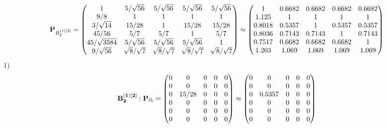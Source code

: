 \documentclass[10pt,a4paper]{article}
\begin{document}
	\[
		\bold{P}_{B_2^{(1)[2]}} = 
		\begin{pmatrix}
			{1}{} & {{5}} / {\sqrt{56}} & {{5}} / {\sqrt{56}} & {{5}} / {\sqrt{56}} & {{5}} / {\sqrt{56}} \\
			{{9}} / {{8}} & {1}{} & {1}{} & {1}{} & {1}{} \\
			{{3}} / {\sqrt{14}} & {{15}} / {{28}} & {1}{} & {{15}} / {{28}} & {{15}} / {{28}} \\
			{{45}} / {{56}} & {{5}} / {{7}} & {{5}} / {{7}} & {1}{} & {{5}} / {{7}} \\
			{{45}} / {\sqrt{3584}} & {{5}} / {\sqrt{56}} & {{5}} / {\sqrt{56}} & {{5}} / {\sqrt{56}} & {1}{} \\
			{{9}} / {\sqrt{56}} & {\sqrt{8}} / {\sqrt{7}} & {\sqrt{8}} / {\sqrt{7}} & {\sqrt{8}} / {\sqrt{7}} & {\sqrt{8}} / {\sqrt{7}} \\
		\end{pmatrix}
		\approx
		\begin{pmatrix}
			1        & 0.6682   & 0.6682   & 0.6682   & 0.6682   \\
			1.125    & 1        & 1        & 1        & 1        \\
			0.8018   & 0.5357   & 1        & 0.5357   & 0.5357   \\
			0.8036   & 0.7143   & 0.7143   & 1        & 0.7143   \\
			0.7517   & 0.6682   & 0.6682   & 0.6682   & 1        \\
			1.203    & 1.069    & 1.069    & 1.069    & 1.069    \\
		\end{pmatrix}
	\]
	1)
	\[
		\bold{B_2^{(1)[2]}}: \bold{P}_{lk} = 
		\begin{pmatrix}
			{{0}}{} & {{0}}{} & {{0}}{} & {{0}}{} & {{0}}{} \\
			{{0}}{} & {{0}}{} & {{0}}{} & {{0}}{} & {{0}}{} \\
			{{0}}{} & {{15}} / {{28}} & {{0}}{} & {{0}}{} & {{0}}{} \\
			{{0}}{} & {{0}}{} & {{0}}{} & {{0}}{} & {{0}}{} \\
			{{0}}{} & {{0}}{} & {{0}}{} & {{0}}{} & {{0}}{} \\
			{{0}}{} & {{0}}{} & {{0}}{} & {{0}}{} & {{0}}{} \\
		\end{pmatrix}
		\approx
		\begin{pmatrix}
			0        & 0        & 0        & 0        & 0        \\
			0        & 0        & 0        & 0        & 0        \\
			0        & 0.5357   & 0        & 0        & 0        \\
			0        & 0        & 0        & 0        & 0        \\
			0        & 0        & 0        & 0        & 0        \\
			0        & 0        & 0        & 0        & 0        \\
		\end{pmatrix}
	\]
\end{document}
